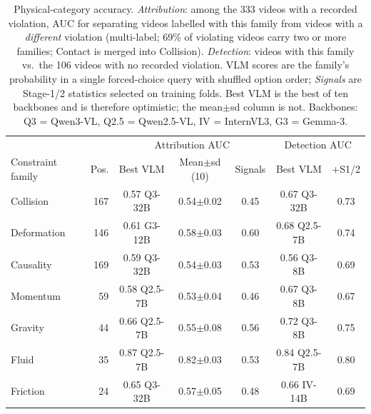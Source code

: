 \begin{table}[t]
    \centering
    \small
    \setlength{\tabcolsep}{4pt}
    \begin{tabular}{@{}lrccc|cc@{}}
        \toprule
        & & \multicolumn{3}{c|}{Attribution AUC} & \multicolumn{2}{c}{Detection AUC} \\
        Constraint family & Pos. & Best VLM & Mean$\pm$sd (10) & Signals & Best VLM & +S1/2 \\
        \midrule
        Collision & 167 & 0.57 {\scriptsize Q3-32B} & 0.54$\pm$0.02 & 0.45 & 0.67 {\scriptsize Q3-32B} & 0.73 \\
        Deformation & 146 & 0.61 {\scriptsize G3-12B} & 0.58$\pm$0.03 & 0.60 & 0.68 {\scriptsize Q2.5-7B} & 0.74 \\
        Causality & 169 & 0.59 {\scriptsize Q3-32B} & 0.54$\pm$0.03 & 0.53 & 0.56 {\scriptsize Q3-8B} & 0.69 \\
        Momentum & 59 & 0.58 {\scriptsize Q2.5-7B} & 0.53$\pm$0.04 & 0.46 & 0.67 {\scriptsize Q3-8B} & 0.67 \\
        Gravity & 44 & 0.66 {\scriptsize Q2.5-7B} & 0.55$\pm$0.08 & 0.56 & 0.72 {\scriptsize Q3-8B} & 0.75 \\
        Fluid & 35 & 0.87 {\scriptsize Q2.5-7B} & 0.82$\pm$0.03 & 0.53 & 0.84 {\scriptsize Q2.5-7B} & 0.80 \\
        Friction & 24 & 0.65 {\scriptsize Q3-32B} & 0.57$\pm$0.05 & 0.48 & 0.66 {\scriptsize IV-14B} & 0.69 \\
        \bottomrule
    \end{tabular}
    \caption{Physical-category accuracy. \emph{Attribution}: among the 333 videos with a recorded violation, AUC for separating videos labelled with this family from videos with a \emph{different} violation (multi-label; 69\% of violating videos carry two or more families; Contact is merged into Collision). \emph{Detection}: videos with this family vs.\ the 106 videos with no recorded violation. VLM scores are the family's probability in a single forced-choice query with shuffled option order; \emph{Signals} are Stage-1/2 statistics selected on training folds. Best VLM is the best of ten backbones and is therefore optimistic; the mean$\pm$sd column is not. Backbones: Q3 = Qwen3-VL, Q2.5 = Qwen2.5-VL, IV = InternVL3, G3 = Gemma-3.}
    \label{tab:category-accuracy}
\end{table}
